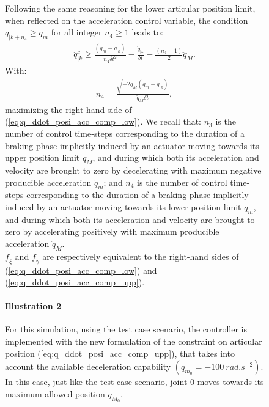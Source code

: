 \begin{figure}[!htbp]
Following the same reasoning for the lower articular position limit, when reflected on the acceleration control variable, the condition $q_{|k+n_4} \geq q_{m}$ for all integer $n_4 \geq 1$ leads to:
\begin{equation}
\begin{split}
\ddot{q}_{|k}^{c} \geq \frac{(q_m-q_{|k})}{n_4 \delta t^2} - \frac{\dot{q}_{|k}}{\delta t} - \frac{(n_4-1)}{2} \ddot{q}_M. 
\label{eq:q_ddot_posi_acc_comp_low}
\end{split}
\end{equation}
With: 
\begin{equation}
\begin{split}
n_4 = \frac{\sqrt{-2 \ddot{q}_M (q_m - q_{|k})}}{\ddot{q}_M \delta t},
\label{eq:n_4_Acc_posi_comp}
\end{split}
\end{equation}
maximizing the right-hand side of (\ref{eq:q_ddot_posi_acc_comp_low}). We recall that: $n_3$ is the number of control time-steps corresponding to the duration of a braking phase implicitly induced by an actuator moving towards its upper position limit $q_M$, and during which both its acceleration and velocity are brought to zero by decelerating with maximum negative producible acceleration $\ddot{q}_m$; and $n_4$ is the number of control time-steps corresponding to the duration of a braking phase implicitly induced by an actuator moving towards its lower position limit $q_m$, and during which both its acceleration and velocity are brought to zero by accelerating positively with maximum producible acceleration $\ddot{q}_M$. \\
$\textit{f}_{\xi}$ and $\textit{f}_{\gamma}$ are respectively equivalent to the right-hand sides of (\ref{eq:q_ddot_posi_acc_comp_low}) and (\ref{eq:q_ddot_posi_acc_comp_upp}).
\paragraph{Illustration 2}
For this simulation, using the test case scenario, the controller is implemented with the new formulation of the constraint on articular position (\ref{eq:q_ddot_posi_acc_comp_upp}), that takes into account the available deceleration capability $(\ddot{q}_{m_{0}} = -100~rad.s^{-2})$. In this case, just like the test case scenario, joint $0$ moves towards its maximum allowed position $q_{M_{0}}$. 


\end{figure}
